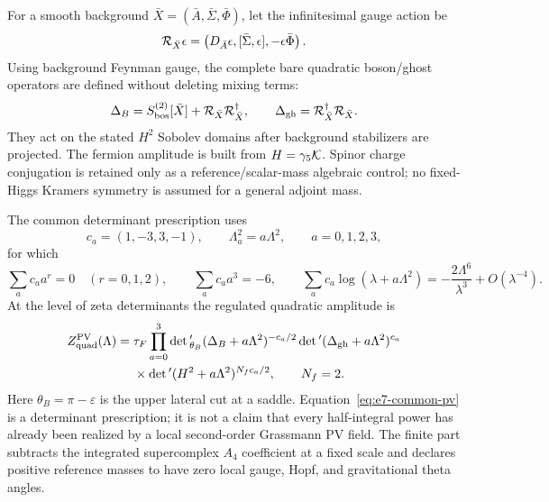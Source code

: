 \documentclass[11pt]{article}
\numberwithin{equation}{section}
\begin{document}
For a smooth background \(\bar X=(\bar A,\bar\Sigma,\bar\Phi)\), let the
infinitesimal gauge action be
\begin{equation}
 {\cal R}_{\bar X}\epsilon
 =\left(D_{\bar A}\epsilon,[\bar\Sigma,\epsilon],-\epsilon\bar\Phi\right).
 \label{eq:e7-gauge-action}
\end{equation}
Using background Feynman gauge, the complete bare quadratic boson/ghost
operators are defined without deleting mixing terms:
\begin{equation}
 \Delta_B=S_{\rm bos}^{(2)}[\bar X]
       +{\cal R}_{\bar X}{\cal R}_{\bar X}^{\dagger},\qquad
 \Delta_{\rm gh}={\cal R}_{\bar X}^{\dagger}{\cal R}_{\bar X}.
 \label{eq:e7-quadratic-complex}
\end{equation}
They act on the stated \(H^2\) Sobolev domains after background stabilizers
are projected.  The fermion amplitude is built from
\(H=\gamma_5{\cal K}\).  Spinor charge conjugation is retained only as a
reference/scalar-mass algebraic control; no fixed-Higgs Kramers symmetry is
assumed for a general adjoint mass.

The common determinant prescription uses
\begin{equation}
 c_a=(1,-3,3,-1),\qquad \Lambda_a^2=a\Lambda^2,\qquad a=0,1,2,3,
 \label{eq:e7-pv-data}
\end{equation}
for which
\begin{equation}
 \sum_ac_aa^r=0\quad(r=0,1,2),\qquad
 \sum_ac_aa^3=-6,\qquad
 \sum_ac_a\log(\lambda+a\Lambda^2)
 =-\frac{2\Lambda^6}{\lambda^3}+O(\lambda^{-4}).
 \label{eq:e7-pv-moments}
\end{equation}
At the level of zeta determinants the regulated quadratic amplitude is
\begin{align}
 Z_{\rm quad}^{\rm PV}(\Lambda)={}&\tau_F
 \prod_{a=0}^3
 \det{}'_{\theta_B}(\Delta_B+a\Lambda^2)^{-c_a/2}
 \det{}'(\Delta_{\rm gh}+a\Lambda^2)^{c_a}\nonumber\\
 &\times\det{}'(H^2+a\Lambda^2)^{N_fc_a/2},\qquad N_f=2.
 \label{eq:e7-common-pv}
\end{align}
Here \(\theta_B=\pi-\varepsilon\) is the upper lateral cut at a saddle.
Equation~\eqref{eq:e7-common-pv} is a determinant prescription; it is not a
claim that every half-integral power has already been realized by a local
second-order Grassmann PV field.  The finite part subtracts the integrated
supercomplex \(A_4\) coefficient at a fixed scale and declares positive
reference masses to have zero local gauge, Hopf, and gravitational theta
angles.
\end{document}
